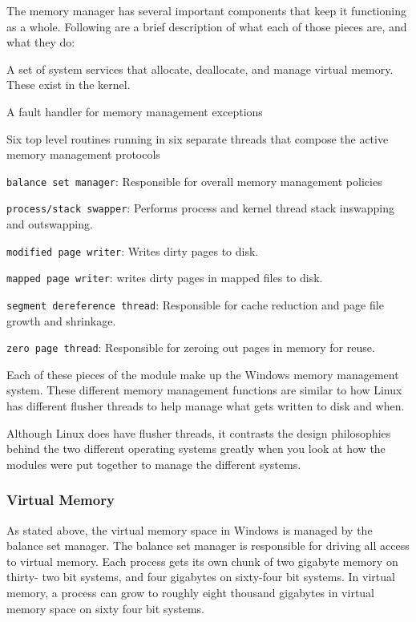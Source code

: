 \documentclass[10pt,letterpaper,onecolumn,draftclsnofoot]{IEEEtran}
\begin{document}
The memory manager has several important components that keep it functioning as a
whole. Following are a brief description of what each of those pieces are, and what
they do: \cite{internals2}
\begin{description}
	\item A set of system services that allocate, deallocate, and manage virtual
	memory. These exist in the kernel.
	\item A fault handler for memory management exceptions
	\item Six top level routines running in six separate threads that compose
	the active memory management protocols
	
	\begin{description}
		\item \texttt{balance set manager}: Responsible for overall
		memory management policies
		\item \texttt{process/stack swapper}: Performs process and
		kernel thread stack inswapping and outswapping.
		\item \texttt{modified page writer}: Writes dirty pages to
		disk.
		\item \texttt{mapped page writer}: writes dirty pages in 
		mapped files to disk. 
		\item \texttt{segment dereference thread}: Responsible for
		cache reduction and page file growth and shrinkage.
		\item \texttt{zero page thread}: Responsible for zeroing
		out pages in memory for reuse.
	\end{description}
\end{description}
Each of these pieces of the module make up the Windows memory management system.
These different memory management functions are similar to how Linux has different
flusher threads to help manage what gets written to disk and when.

Although Linux does have flusher threads, it contrasts the design philosophies behind
the two different operating systems greatly when you look at how the modules were put together to manage the different systems. 

\subsubsection{Virtual Memory}
As stated above, the virtual memory space in Windows is managed by the balance
set manager. The balance set manager is responsible for driving all access
to virtual memory. Each process gets its own chunk of two gigabyte memory on thirty-
two bit systems, and four gigabytes on sixty-four bit systems. In virtual memory,
a process can grow to roughly eight thousand gigabytes in virtual memory space on
sixty four bit systems.\cite{internals2}
\end{document}
